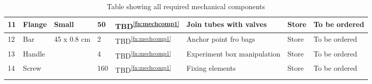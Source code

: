\begin{longtable}{|m{}|m{}|m{}|m{}|m{}|m{}|m{}|m{}|}
11 & Flange & Small & 50 & TBD\textsuperscript{\ref{fn:mechcomp1}} & Join tubes with valves & Store & To be ordered \\ \hline
12 & Bar & 45 x 0.8 cm & 2 & TBD\textsuperscript{\ref{fn:mechcomp1}} & Anchor point fro bags & Store & To be ordered \\ \hline
13 & Handle &  & 4 & TBD\textsuperscript{\ref{fn:mechcomp1}} & Experiment box manipulation & Store & To be ordered \\ \hline
14 & Screw &  & 160 & TBD\textsuperscript{\ref{fn:mechcomp1}} & Fixing elements & Store & To be ordered \\ \hline

    \caption{Table showing all required mechanical components}
    \label{tab:mechanical-components}
\end{longtable}
\raggedbottom